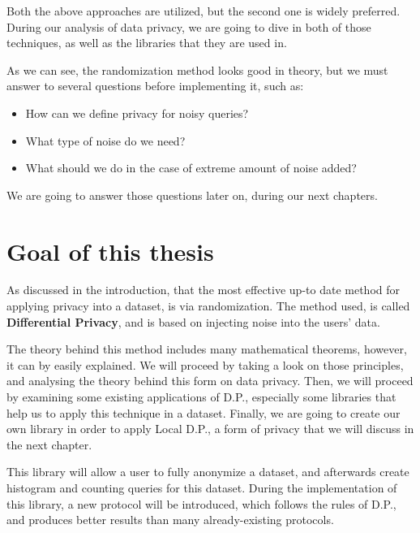 Both the above approaches are utilized, but the second one is widely preferred. During our analysis of data privacy, we are going to dive in both of those techniques, as well as the libraries that they are used in.

\par As we can see, the randomization method looks good in theory, but we must answer to several questions before implementing it, such as:

\begin{itemize}
    \item How can we define privacy for noisy queries?
    \item What type of noise do we need?
    \item What should we do in the case of extreme amount of noise added?
\end{itemize}

We are going to answer those questions later on, during our next chapters. 

\section{Goal of this thesis}
As discussed in the introduction, that the most effective up-to date method for applying privacy into a dataset, is via randomization. The method used, is called \textbf{Differential Privacy}, and is based on injecting noise into the users' data. 

The theory behind this method includes many mathematical theorems, however, it can by easily explained. We will proceed by taking a look on those principles, and analysing the theory behind this form on data privacy. Then, we will proceed by examining some existing applications of D.P., especially some libraries that help us to apply this technique in a dataset. Finally, we are going to create our own library in order to apply Local D.P., a form of privacy that we will discuss in the next chapter. 

This library will allow a user to fully anonymize a dataset, and afterwards create histogram and counting queries for this dataset. During the implementation of this library, a new protocol will be introduced, which follows the rules of D.P., and produces better results than many already-existing protocols.

